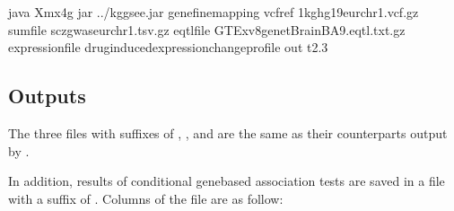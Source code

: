 \documentclass[letterpaper,10pt,english,openany,oneside]{sphinxmanual}
\begin{document}
\begin{sphinxVerbatim}[commandchars=\\\{\}]
java \PYGZhy{}Xmx4g \PYGZhy{}jar ../kggsee.jar 
  \PYGZhy{}\PYGZhy{}gene\PYGZhy{}finemapping 
  \PYGZhy{}\PYGZhy{}vcf\PYGZhy{}ref 1kg\PYGZus{}hg19\PYGZus{}eur\PYGZus{}chr1.vcf.gz 
  \PYGZhy{}\PYGZhy{}sum\PYGZhy{}file scz\PYGZus{}gwas\PYGZus{}eur\PYGZus{}chr1.tsv.gz 
  \PYGZhy{}\PYGZhy{}eqtl\PYGZhy{}file GTEx\PYGZus{}v8\PYGZus{}genet\PYGZus{}BrainBA9.eqtl.txt.gz 
  \PYGZhy{}\PYGZhy{}expression\PYGZhy{}file drug\PYGZhy{}induced\PYGZus{}expression\PYGZus{}change\PYGZus{}profile 
  \PYGZhy{}\PYGZhy{}out t2.3
\end{sphinxVerbatim}


\subsection{Outputs}
\label{\detokenize{detailed_document:id5}}
\sphinxAtStartPar
The three files with suffixes of , , and  are the same as their counterparts output by {\hyperref[\detokenize{detailed_document:detail-ecs}]{}}.

\sphinxAtStartPar
In addition, results of conditional gene\sphinxhyphen{}based association tests are saved in a file with a suffix of . Columns of the file are as follow:
\end{document}
